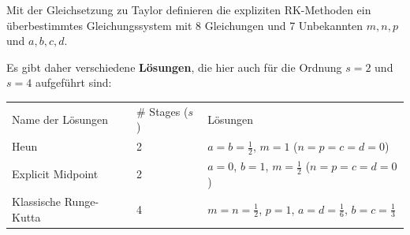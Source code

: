       Mit der Gleichsetzung zu Taylor definieren die expliziten RK-Methoden ein 
      überbestimmtes Gleichungssystem mit 8 Gleichungen und 7 Unbekannten $m,n,p$ und $a,b,c,d$.
      
      Es gibt daher verschiedene \textbf{Lösungen}, die hier auch für die Ordnung $s=2$ und $s=4$ aufgeführt sind:\\
      \begin{tabular}{lll}
        Name der Lösungen & \# Stages ($s$) & Lösungen\\
        Heun & 2 & $a=b=\frac12$, $m=1$ ($n=p=c=d=0$)\\
        Explicit Midpoint & 2 & $a=0$, $b=1$, $m=\frac12$ ($n=p=c=d=0$)\\
        Klassische Runge-Kutta & 4 & $m=n=\frac12$, $p=1$, $a=d=\frac16$, $b=c=\frac13$
      \end{tabular}
      
      \vfill
      
      \newpage
      
